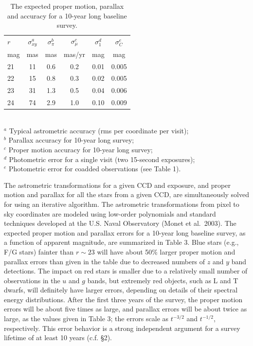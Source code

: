 \documentclass{emulateapj}
\begin{document}
\begin{table}[b!]
\caption{The expected proper motion, parallax and accuracy for a 10-year long baseline survey.}
\begin{tabular}{|l|c|c|c|c|c|}
\hline  
    $r$   &  $\sigma^a_{xy} $  & $\sigma^b_\pi$  &   $\sigma^c_\mu$   &  $\sigma^d_1$  &  $\sigma^e_C$  \\
    mag &       mas            &      mas  & mas/yr &   mag   &    mag  \\
\hline  
       21 &  11  &  0.6  &  0.2   &   0.01  &   0.005 \\
       22 &  15  &  0.8  &  0.3   &   0.02  &   0.005 \\
       23 &  31  &  1.3  &  0.5   &   0.04  &   0.006 \\
       24 &  74  &  2.9  &  1.0   &   0.10  &   0.009 \\
\hline                         
\end{tabular}
\\ \vskip 0.05in
  $^a$ Typical astrometric accuracy (rms per coordinate per visit); \\
  $^b$ Parallax accuracy for 10-year long survey; \\
  $^c$ Proper motion accuracy for 10-year long survey; \\
  $^d$ Photometric error for a single visit (two 15-second exposures); \\
  $^e$ Photometric error for coadded observations (see Table 1). \\
\end{table}


The astrometric transformations for a given CCD and exposure, and 
proper motion and parallax for all the stars from a given CCD, are simultaneously
solved for using an iterative algorithm. The astrometric transformations from
pixel to sky coordinates are modeled using low-order polynomials and standard
techniques developed at the U.S. Naval Observatory (Monet et al.~2003). The expected 
proper motion and 
parallax errors for a 10-year long baseline survey, as a function of apparent 
magnitude, are summarized in Table 3. Blue stars (e.g., F/G stars) fainter than 
$r\sim23$ will have about 50\% larger proper motion and parallax errors than 
given in the table due to decreased numbers of $z$ and $y$ band detections. The 
impact on red stars is smaller due to a relatively small number of observations 
in the $u$ and $g$ bands, but extremely red objects, such as L and T dwarfs, 
will definitely have larger errors, depending on details of their spectral 
energy distributions.  After the first three years of the survey, 
{the proper motion errors will be about five times as large, and parallax
errors will be about twice as large,} as the values given in Table 3; the errors
scale as $t^{-3/2}$ and $t^{-1/2}$, respectively. This error behavior is 
a strong independent argument for a survey lifetime of at least 10 years 
(c.f. \S 2).  
\end{document}
